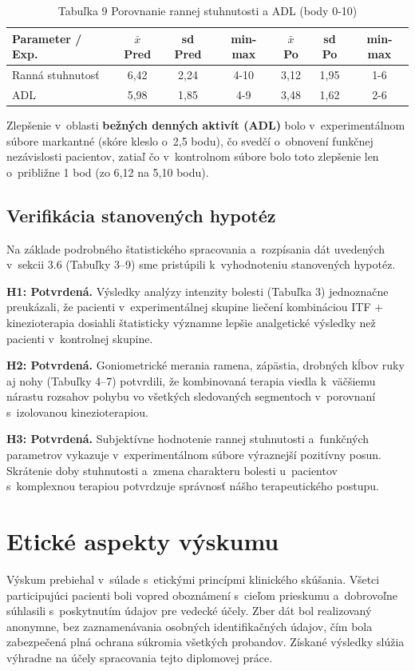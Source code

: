 \begin{table}[H]
\centering
\caption*{Tabuľka 9 Porovnanie rannej stuhnutosti a ADL (body 0-10)}
\begin{tabular}{|l|c|c|c|c|c|c|}
\hline
\textbf{Parameter / Exp.} & \textbf{$\bar{x}$ Pred} & \textbf{sd Pred} & \textbf{min-max} & \textbf{$\bar{x}$ Po} & \textbf{sd Po} & \textbf{min-max} \\ \hline
Ranná stuhnutosť & 6,42 & 2,24 & 4-10 & 3,12 & 1,95 & 1-6 \\ \hline
ADL & 5,98 & 1,85 & 4-9 & 3,48 & 1,62 & 2-6 \\ \hline
\end{tabular}
\end{table}

Zlepšenie v~oblasti \textbf{bežných denných aktivít (ADL)} bolo v~experimentálnom súbore markantné (skóre kleslo o~2,5 bodu), čo svedčí o~obnovení funkčnej nezávislosti pacientov, zatiaľ čo v~kontrolnom súbore bolo toto zlepšenie len o~približne 1 bod (zo 6,12 na 5,10 bodu).

\subsection{Verifikácia stanovených hypotéz}

Na základe podrobného štatistického spracovania a~rozpísania dát uvedených v~sekcii 3.6 (Tabuľky 3--9) sme pristúpili k~vyhodnoteniu stanovených hypotéz.

\textbf{H1: Potvrdená.} Výsledky analýzy intenzity bolesti (Tabuľka 3) jednoznačne preukázali, že pacienti v~experimentálnej skupine liečení kombináciou ITF + kinezioterapia dosiahli štatisticky významne lepšie analgetické výsledky než pacienti v~kontrolnej skupine.

\textbf{H2: Potvrdená.} Goniometrické merania ramena, zápästia, drobných kĺbov ruky aj nohy (Tabuľky 4--7) potvrdili, že kombinovaná terapia viedla k~väčšiemu nárastu rozsahov pohybu vo všetkých sledovaných segmentoch v~porovnaní s~izolovanou kinezioterapiou.

\textbf{H3: Potvrdená.} Subjektívne hodnotenie rannej stuhnutosti a~funkčných parametrov vykazuje v~experimentálnom súbore výraznejší pozitívny posun. Skrátenie doby stuhnutosti a~zmena charakteru bolesti u~pacientov s~komplexnou terapiou potvrdzuje správnosť nášho terapeutického postupu.

\section{Etické aspekty výskumu}

Výskum prebiehal v~súlade s~etickými princípmi klinického skúšania. Všetci participujúci pacienti boli vopred oboznámení s~cieľom prieskumu a~dobrovoľne súhlasili s~poskytnutím údajov pre vedecké účely. Zber dát bol realizovaný anonymne, bez zaznamenávania osobných identifikačných údajov, čím bola zabezpečená plná ochrana súkromia všetkých probandov. Získané výsledky slúžia výhradne na účely spracovania tejto diplomovej práce.

\clearpage
